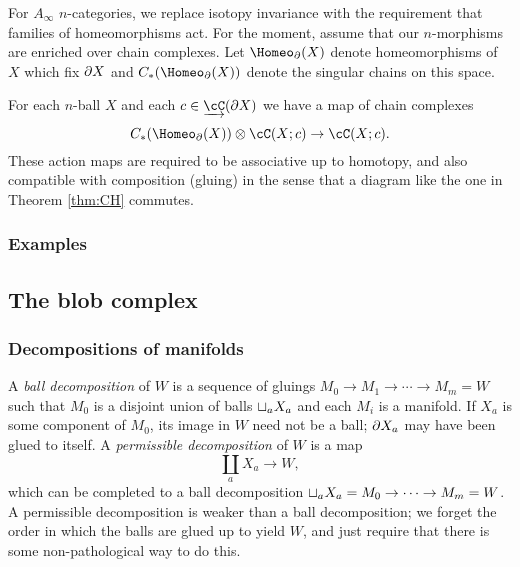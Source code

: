 \documentclass{pnastwo}
\begin{document}
\begin{article}
\smallskip

For $A_\infty$ $n$-categories, we replace
isotopy invariance with the requirement that families of homeomorphisms act.
For the moment, assume that our $n$-morphisms are enriched over chain complexes.
Let $\Homeo_\bd(X)$ denote homeomorphisms of $X$ which fix $\partial X$ and
$C_*(\Homeo_\bd(X))$ denote the singular chains on this space.


\begin{axiom}
\label{axiom:families}
For each $n$-ball $X$ and each $c\in \cl{\cC}(\bd X)$ we have a map of chain complexes
\[
	C_*(\Homeo_\bd(X))\ot \cC(X; c) \to \cC(X; c) .
\]
These action maps are required to be associative up to homotopy,
and also compatible with composition (gluing) in the sense that
a diagram like the one in Theorem \ref{thm:CH} commutes.
\end{axiom}



\subsubsection{Examples}

\subsection{The blob complex}
\subsubsection{Decompositions of manifolds}


A \emph{ball decomposition} of $W$ is a 
sequence of gluings $M_0\to M_1\to\cdots\to M_m = W$ such that $M_0$ is a disjoint union of balls
$\sqcup_a X_a$ and each $M_i$ is a manifold.
If $X_a$ is some component of $M_0$, its image in $W$ need not be a ball; $\partial X_a$ may have been glued to itself.
A {\it permissible decomposition} of $W$ is a map
\[
	\coprod_a X_a \to W,
\]
which can be completed to a ball decomposition $\sqcup_a X_a = M_0\to\cdots\to M_m = W$.
A permissible decomposition is weaker than a ball decomposition; we forget the order in which the balls
are glued up to yield $W$, and just require that there is some non-pathological way to do this.


\end{article}
\end{document}
